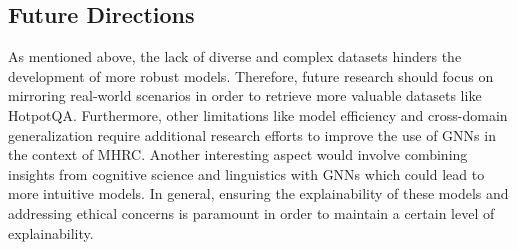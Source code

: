 \documentclass[sigplan,screen]{acmart}
\begin{document}
\subsection{Future Directions}
As mentioned above, the lack of diverse and complex datasets hinders the development of more robust models. Therefore, future research should 
focus on mirroring real-world scenarios in order to retrieve more valuable datasets like HotpotQA. Furthermore, other limitations like model efficiency and 
cross-domain generalization require additional research efforts to improve the use of GNNs in the context of MHRC. Another interesting aspect would 
involve combining insights from cognitive science and linguistics with GNNs which could lead to more intuitive models. In general, 
ensuring the explainability of these models and addressing ethical concerns is paramount in order to maintain a certain level of explainability. 



\end{document}
